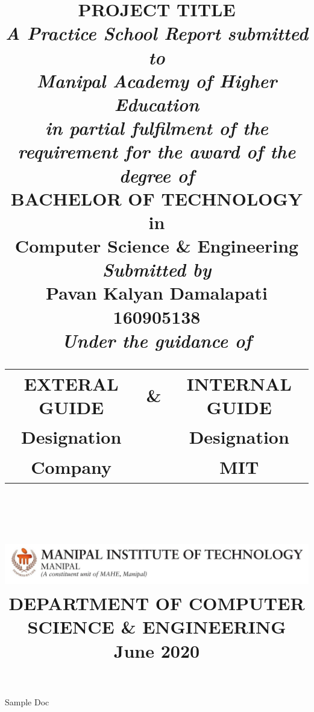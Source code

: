 \documentclass[a4paper,12pt]{report}
\date{}
\author{}
\title{\vspace{-4.0cm}
    {\textbf{PROJECT TITLE}}\\[1em]
    {\small \textit{A Practice School Report submitted to \\Manipal Academy of Higher Education\\in partial fulfilment of the requirement for the award of the degree of\\[2em]}}
    {\textbf{BACHELOR OF TECHNOLOGY\\in\\ Computer Science \& Engineering\\[2em]}}
    {\small \textit{Submitted by\\}}
    {\textbf{Pavan Kalyan Damalapati\\}}
    {\large 160905138\\[0.5em]}
    {\small \textit{Under the guidance of\\[1em]}}
    {\begin{tabular}{c c c}
            EXTERAL GUIDE & \& & INTERNAL GUIDE \\
            Designation &         & Designation \\
            Company &             & MIT \\
    \end{tabular}\\[1em]}
    \includegraphics[height=2cm,width=13.5cm]{mit.jpg} \\
    {\normalsize DEPARTMENT OF COMPUTER SCIENCE \& ENGINEERING} \\
    {\large June 2020}
}
\begin{document}
\maketitle
Sample Doc
\end{document}
